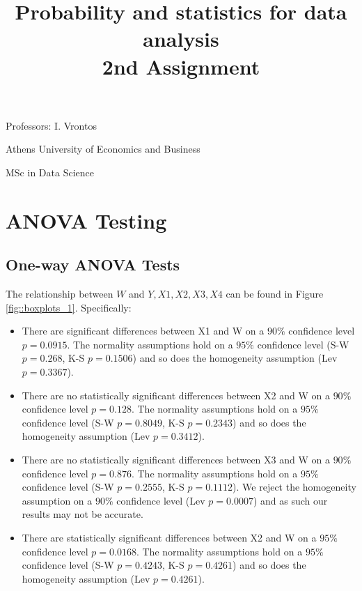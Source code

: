 \documentclass[12pt, a4paper]{article}
\title{\Huge Probability and statistics for data analysis\\ \LARGE 2nd Assignment }
\begin{document}
	
	\begin{titlepage}
		\maketitle
		\begin{center}
			
			\LARGE Professors: I. Vrontos
			
			\large Athens University of Economics and Business
			
			\large MSc in Data Science
			
		\end{center}
		
	\end{titlepage}
	
	\tableofcontents
	\newpage
	
	\section{ANOVA Testing}
	
	\subsection{One-way ANOVA Tests}
	
	The relationship between $W$ and $Y, X1, X2, X3, X4$ can be found in Figure \ref{fig::boxplots_1}. Specifically:
	
	\begin{itemize}
		\item There are significant differences between X1 and W  on a $90\%$ confidence level $p = 0.0915$. The normality assumptions hold on a $95\%$ confidence level (S-W $p=0.268$, K-S $p=0.1506$) and so does the homogeneity assumption (Lev $p=0.3367$).
		
		\item There are no statistically significant differences between X2 and W  on a $90\%$ confidence level $p = 0.128$. The normality assumptions hold on a $95\%$ confidence level (S-W $p=0.8049$, K-S $p=0.2343$) and so does the homogeneity assumption (Lev $p=0.3412$).
		
		\item There are no statistically significant differences between X3 and W  on a $90\%$ confidence level $p = 0.876$. The normality assumptions hold on a $95\%$ confidence level (S-W $p=0.2555$, K-S $p=0.1112$). We reject the homogeneity assumption on a $90\%$ confidence level (Lev $p=0.0007$) and as such our results may not be accurate.
		
		\item There are statistically significant differences between X2 and W on a $95\%$ confidence level $p = 0.0168$. The normality assumptions hold on a $95\%$ confidence level (S-W $p=0.4243$, K-S $p=0.4261$) and so does the homogeneity assumption (Lev $p=0.4261$).
		
	\end{itemize}
	 
\end{document}
